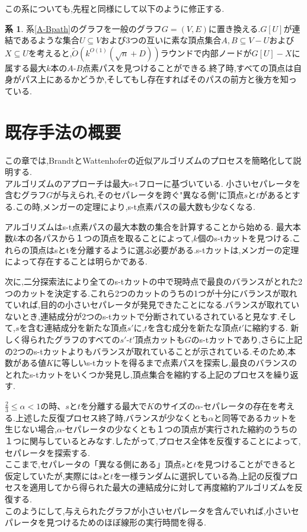 \documentclass{thesis}
\theoremstyle{definition}
\newtheorem{corollary}{系}
\begin{document}
この系についても,先程と同様にして以下のように修正する.

\begin{corollary}
    系\ref{A-Bpath}のグラフを一般のグラフ$G =(V,E)$に置き換える.$G[U]$が連結であるような集合$U \subseteq V$および3つの互いに素な頂点集合$A,B \subseteq V - U$および$X \subseteq U$を考えると,$\tilde{O}(k^{O(1)}(\sqrt{n}+D))$ラウンドで内部ノードが$G[U] - X$に属する最大$k$本の$A$-$B$点素パスを見つけることができる.終了時,すべての頂点は自身がパス上にあるかどうか,そしてもし存在すればそのパスの前方と後方を知っている.
\end{corollary}


\chapter{既存手法の概要}

この章では,BrandtとWattenhoferの近似アルゴリズム\cite{brandt2017approximating}のプロセスを簡略化して説明する.\\

アルゴリズムのアプローチは最大s-tフローに基づいている.
小さいセパレータを含むグラフ$G$が与えられ,そのセパレータを跨ぐ"異なる側"に頂点$s$と$t$があるとする.この時,メンガーの定理により,s-t点素パスの最大数も少なくなる.\par
アルゴリズムはs-t点素パスの最大本数の集合を計算することから始める.
最大本数$k$本の各パスから１つの頂点を取ることによって,$k$個のs-tカットを見つける.これらの頂点はsとtを分離するように選ぶ必要がある.s-tカットは,メンガーの定理によって存在することは明らかである.\par

次に,二分探索法により全てのs-tカットの中で現時点で最良のバランスがとれた2つのカットを決定する.これら2つのカットのうちの1つが十分にバランスが取れていれば,目的の小さいセパレータが発見できたことになる.バランスが取れていないとき,連結成分が2つのs-tカットで分断されているされていると見なす.そして,$s$を含む連結成分を新たな頂点$s'$に,$t$を含む成分を新たな頂点$t'$に縮約する.
新しく得られたグラフのすべての$s'$-$t'$頂点カットも$G$のs-tカットであり,さらに上記の2つのs-tカットよりもバランスが取れていることが示されている.そのため,本数がある値$K$に等しいs-tカットを得るまで点素パスを探索し,最良のバランスのとれたs-tカットをいくつか発見し,頂点集合を縮約する上記のプロセスを繰り返す.\par

$\frac{2}{3} \leq \alpha < 1$の時、$s$と$t$を分離する最大で$K$のサイズの$\alpha$-セパレータの存在を考える.上述した反復プロセス終了時,バランスが少なくとも$\alpha$と同等であるカットを生じない場合,$\alpha$-セパレータの少なくとも１つの頂点が実行された縮約のうちの１つに関与しているとみなす.したがって,プロセス全体を反復することによって,セパレータを探索する.\\
ここまで,セパレータの「異なる側にある」頂点$s$と$t$を見つけることができると仮定していたが,実際には$s$と$t$を一様ランダムに選択している為,上記の反復プロセスを適用してから得られた最大の連結成分に対して再度縮約アルゴリズムを反復する.\\
このようにして,与えられたグラフが小さいセパレータを含んでいれば,小さいセパレータを見つけるためのほぼ線形の実行時間を得る.\par
\end{document}
